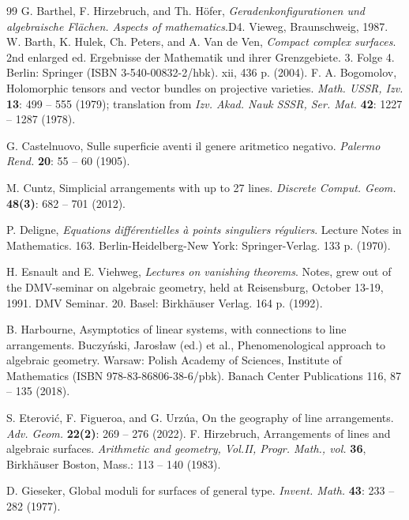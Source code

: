 \documentclass{article}
\theoremstyle{plain}
\theoremstyle{definition}
\numberwithin{equation}{section}
\begin{document}
\begin{thebibliography}{99}
G. Barthel, F. Hirzebruch, and Th. H\"ofer, \newblock \textit{Geradenkonfigurationen und algebraische Fl\"achen. Aspects of mathematics}.\newblock D4. Vieweg, Braunschweig, 1987.
W. Barth, K. Hulek, Ch. Peters, and A. Van de Ven, \textit{Compact complex surfaces}. 2nd enlarged ed.
Ergebnisse der Mathematik und ihrer Grenzgebiete. 3. Folge 4. Berlin: Springer (ISBN 3-540-00832-2/hbk). xii, 436 p. (2004).
F. A. Bogomolov, Holomorphic tensors and vector bundles on projective varieties. \textit{Math. USSR, Izv.} \textbf{13}:  499 -- 555 (1979); translation from \textit{Izv. Akad. Nauk SSSR, Ser. Mat.} \textbf{42}: 1227 -- 1287 (1978).

G. Castelnuovo, Sulle superficie aventi il genere aritmetico negativo. \textit{Palermo Rend.} \textbf{20}: 55 -- 60 (1905).

M. Cuntz, Simplicial arrangements with up to 27 lines. \textit{Discrete Comput. Geom.} \textbf{48(3)}: 682 -- 701 (2012).

P. Deligne, \textit{Equations diff{\'e}rentielles {\`a} points singuliers r{\'e}guliers}. Lecture Notes in Mathematics. 163. Berlin-Heidelberg-New York: Springer-Verlag. 133 p. (1970).

H. Esnault and E. Viehweg, \textit{Lectures on vanishing theorems}. Notes, grew out of the DMV-seminar on algebraic geometry, held at Reisensburg, October 13-19, 1991. DMV Seminar. 20. Basel: Birkhäuser Verlag. 164 p. (1992).

B. Harbourne, Asymptotics of linear systems, with connections to line arrangements. Buczyński, Jarosław (ed.) et al., Phenomenological approach to algebraic geometry. Warsaw: Polish Academy of Sciences, Institute of Mathematics (ISBN 978-83-86806-38-6/pbk). Banach Center Publications 116, 87 -- 135 (2018).

S. Eterovi\'c, F. Figueroa, and G. Urz\'ua,
On the geography of line arrangements.  \textit{Adv. Geom.} \textbf{22(2)}: 269 -- 276 (2022).
F. Hirzebruch, \newblock Arrangements of lines and algebraic surfaces. \newblock \textit{Arithmetic and geometry, Vol.II, Progr. Math., vol.} \textbf{36}, Birkh\"auser Boston, Mass.: 113 -- 140 (1983).

D. Gieseker, Global moduli for surfaces of general type. \textit{Invent. Math.} \textbf{43}: 233 -- 282 (1977).


\end{thebibliography}
\end{document}
